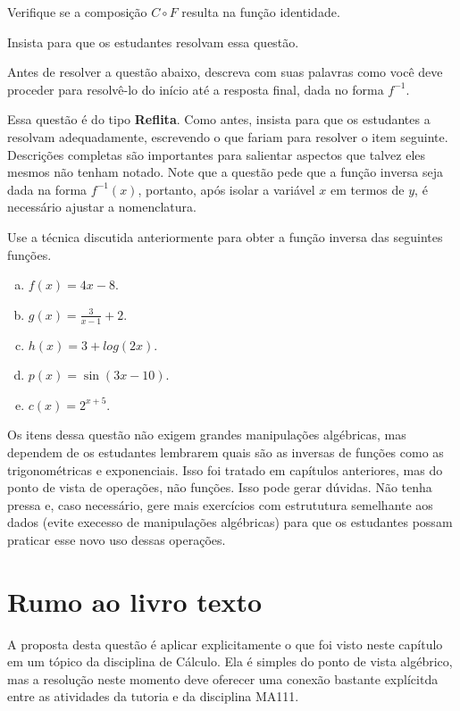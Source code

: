 \documentclass[main_estudante.tex]{subfiles}
\begin{document}
\begin{questao}
Verifique se a composição $C \circ F$ resulta na função identidade.
\end{questao}

Insista para que os estudantes resolvam essa questão.

\begin{reflita}
Antes de resolver a questão abaixo, descreva com suas palavras como você deve proceder para resolvê-lo do início até a resposta final, dada no forma $f^{-1}$. 
\end{reflita}

Essa questão é do tipo \textbf{Reflita}. Como antes, insista para que os estudantes a resolvam adequadamente, escrevendo o que fariam para resolver o item seguinte. Descrições completas são importantes para salientar aspectos que talvez eles mesmos não tenham notado. Note que a questão pede que a função inversa seja dada na forma $f^{-1}(x)$, portanto, após isolar a variável $x$ em termos de $y$, é necessário ajustar a nomenclatura.

\begin{questao}
Use a técnica discutida anteriormente para obter a função inversa das seguintes funções.
\begin{enumerate}[a)]
\item $f(x)=4x-8$.
\item $g(x)=\frac{3}{x-1}+2$.
\item $h(x)=3+log(2x)$.
\item $p(x)=\sin(3x-10)$.
\item $c(x)=2^{x+5}$.
\end{enumerate}
\end{questao}

Os itens dessa questão não exigem grandes manipulações algébricas, mas dependem de os estudantes lembrarem quais são as inversas de funções como as trigonométricas e exponenciais. Isso foi tratado em capítulos anteriores, mas do ponto de vista de operações, não funções. Isso pode gerar dúvidas. Não tenha pressa e, caso necessário, gere mais exercícios com estrututura semelhante aos dados (evite execesso de manipulações algébricas) para que os estudantes possam praticar esse novo uso dessas operações.

\section{Rumo ao livro texto}

A proposta desta questão é aplicar explicitamente o que foi visto neste capítulo em um tópico da disciplina de Cálculo. Ela é simples do ponto de vista algébrico, mas a resolução neste momento deve oferecer uma conexão bastante explícitda entre as atividades da tutoria e da disciplina MA111.
\end{document}
